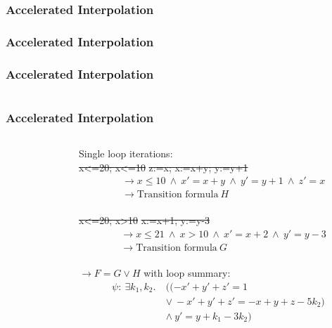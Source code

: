 \begin{frame}[t]
	\frametitle{Accelerated Interpolation}
	\resizebox{\textwidth}{!}{}
\end{frame}

\begin{frame}[t]	\frametitle{Accelerated Interpolation}
	\resizebox{0.5\textwidth}{!}{}
\end{frame}

\begin{frame}[t]
	\frametitle{Accelerated Interpolation}
	\begin{columns}
		\begin{column}{0.3\textwidth}
			\resizebox{0.8\textwidth}{!}{}
		\end{column}
		\begin{column}{0.55\textwidth}
			\onslide<2-5>
			\resizebox{0.4\textwidth}{!}{}
		\end{column}
	\end{columns}
\end{frame}

\begin{frame}[t]
	\frametitle{Accelerated Interpolation}
	\begin{columns}
		\begin{column}{0.3\textwidth}
			\resizebox{0.8\textwidth}{!}{}
		\end{column}
		\begin{column}{0.55\textwidth}
			Single loop iterations: \vspace*{0.25cm}\\
			\st{x<=20; x<=10} \st{z:=x; x:=x+y; y:=y+1}
			\onslide<2->
			{\small 
			\begin{align*}
			&\rightarrow x \leq 10\ \land\ x' = x + y\ \land\ y' = y + 1\ \land\ z' = x \\
			&\rightarrow \text{Transition formula}\ H 
			\end{align*}
			}%
			\onslide<1-> \\
			\vspace*{1cm}\st{x<=20; x>10} \st{x:=x+1; y:=y-3}
			\onslide<2->
			\begin{align*}
			&\rightarrow	x \leq 21\ \land\ x > 10\ \land\ x' = x + 2\ \land\ y' = y -3 \\
			&\rightarrow \text{Transition formula}\ G
			\end{align*}
			\onslide<3-> \\
			\vspace*{0.5cm}
			$\rightarrow F = G \lor H$ \onslide<4-> with loop summary:
			\begin{align*}
				\psi: \	\exists k_1, k_2.\ &((-x' + y' + z' = 1\ \\ & \lor\ -x' + y' + z' = -x + y + z - 5k_2)\ \\ &\land\ y' = y + k_1 - 3k_2)\
			\end{align*}
		\end{column}
	\end{columns}
\end{frame}

